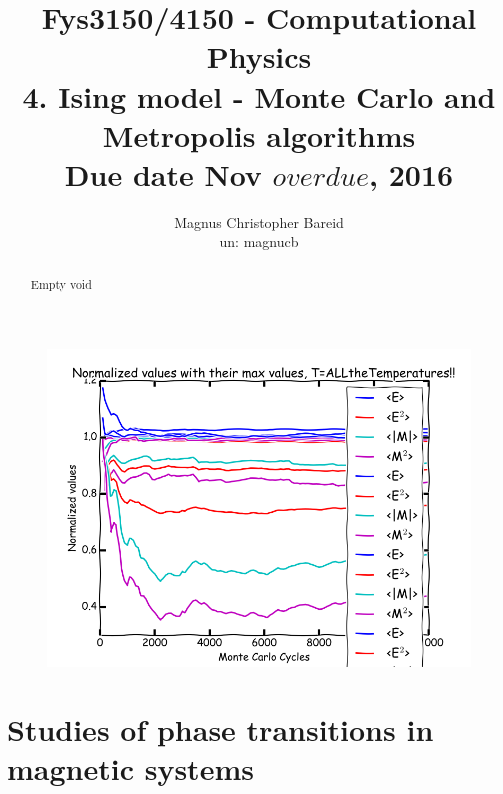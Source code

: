 \documentclass[11pt,a4paper,notitlepage,twocolumn]{article}
\title{\normalsize Fys3150/4150 - Computational Physics\\
\vspace{10mm}
\huge 4. Ising model - Monte Carlo and Metropolis algorithms\\
\vspace{10mm}
\normalsize Due date {\bf Nov $overdue$, 2016}}
\author{Magnus Christopher Bareid \\ un: magnucb }
\begin{document}
\noindent
\maketitle
\vspace{5mm}




\newpage
\begin{figure}[H]
\center
\includegraphics[scale=0.35]{../frontpage.png}
\end{figure}

\begin{abstract}
Empty void %
\end{abstract}

\newpage
\tableofcontents




\newpage

\section*{Studies of phase transitions in magnetic systems}
\end{document}

